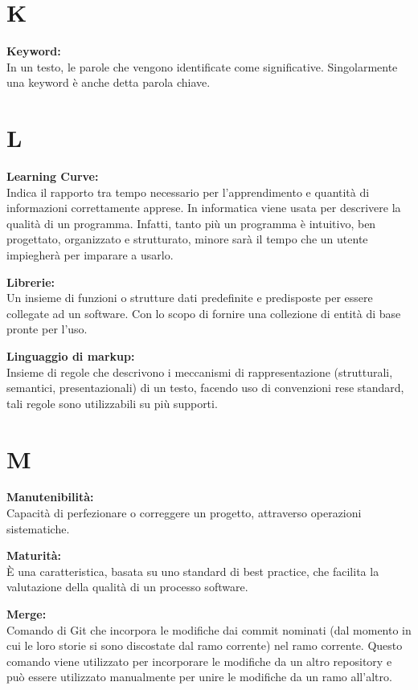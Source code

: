 \documentclass[a4paper, oneside, openany, dvipsnames, table]{article}
\begin{document}
\newpage
\section{K}
\textbf{Keyword:}\\	In un testo, le parole che vengono identificate come significative. Singolarmente una keyword è anche detta parola chiave.

\newpage
\section{L}
\textbf{Learning Curve:}\\	Indica il rapporto tra tempo necessario per l'apprendimento e quantità di informazioni correttamente apprese. In informatica viene usata per descrivere la qualità di un programma. Infatti, tanto più un programma è intuitivo, ben progettato, organizzato e strutturato, minore sarà il tempo che un utente impiegherà per imparare a usarlo. 

\textbf{Librerie:}\\	Un insieme di funzioni o strutture dati predefinite e predisposte per essere collegate ad un software. Con lo scopo di fornire una collezione di entità di base pronte per l'uso.

\textbf{Linguaggio di markup:}\\  Insieme di regole che descrivono i meccanismi di rappresentazione (strutturali, semantici, presentazionali) di un testo, facendo uso di convenzioni rese standard, tali regole sono utilizzabili su più supporti.

\newpage
\section{M}
\textbf{Manutenibilità:}\\ Capacità di perfezionare o correggere un progetto, attraverso operazioni sistematiche.

\textbf{Maturità:}\\ \`E una caratteristica, basata su uno standard di best practice, che facilita la valutazione della qualità di un processo software. 

\textbf{Merge:}\\	Comando di Git che incorpora le modifiche dai commit nominati (dal momento in cui le loro storie si sono discostate dal ramo corrente) nel ramo corrente. Questo comando viene utilizzato per incorporare le modifiche da un altro repository e può essere utilizzato manualmente per unire le modifiche da un ramo all'altro.
\end{document}
